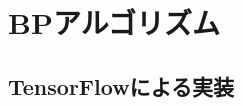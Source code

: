 \begin{savequote}[45mm]
\end{savequote}

\chapter{BPアルゴリズム} 
\label{ch:bp}

\begin{content}

\end{content}

\section{TensorFlowによる実装}

